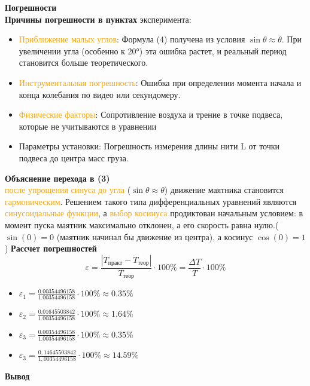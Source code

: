 \documentclass{beamer}
\begin{document}
	\newpage
	\large \textbf{\textcolor{structure.fg}{Погрешности}}\\
	\textbf{Причины погрешности в пунктах }эксперимента:
	\begin{itemize}
	\item \textcolor{orange}{Приближение малых углов}: Формула (4) получена из условия $\sin \theta \approx \theta$. При увеличении угла (особенно к 20°) эта ошибка растет, и реальный период становится больше теоретического.
	\item \textcolor{orange}{Инструментальная погрешность}: Ошибка при определении момента начала и конца колебания по видео или секундомеру.
	\item \textcolor{orange}{Физические факторы}: Сопротивление воздуха и трение в точке подвеса, которые не учитываются в уравнении 
	\item {Параметры установки}: Погрешность измерения длины нити L от точки подвеса до центра масс груза.
	\end{itemize}
	\newpage
	\textbf{Объяснение перехода в (3)}\\
	 \textcolor{orange}{после упрощения синуса до угла} ($\sin \theta \approx \theta$) движение маятника становится \textcolor{orange}{гармоническим}. Решением такого типа дифференциальных уравнений являются \textcolor{orange}{синусоидальные функции}, а \textcolor{orange}{выбор косинуса} продиктован начальным условием: в момент пуска маятник максимально отклонен, а его скорость равна нулю.($\sin(0) = 0$ (маятник начинал бы движение из центра), а косинус $\cos(0) = 1$)
	\newpage
	\textbf{Рассчет погрешностей}
	\[
	\boxed{\varepsilon = \frac{|T_{\text{практ}} - T_{\text{теор}}|}{T_{\text{теор}}} \cdot 100\% = \frac{\Delta T}{T}\cdot 100\%} \]
	\begin{itemize}
	\item\(
	\varepsilon_1 = \frac{0.00354496158}{1.00354496158} \cdot 100\% \approx 0.35\% 
	\)
	\item\(
	\varepsilon_2 = \frac{0.01645503842}{1.00354496158} \cdot 100\% \approx 1.64\% 
	\)
	\item\(
	\varepsilon_3 = \frac{0.00354496158}{1.00354496158} \cdot 100\% \approx 0.35\% 
	\)
	\item\(
	\varepsilon_3 = \frac{0,14645503842}{1,00354496158} \cdot 100\% \approx 14.59\% 
	\)
\end{itemize}
	\newpage
	\textbf{Вывод}
\end{document}
